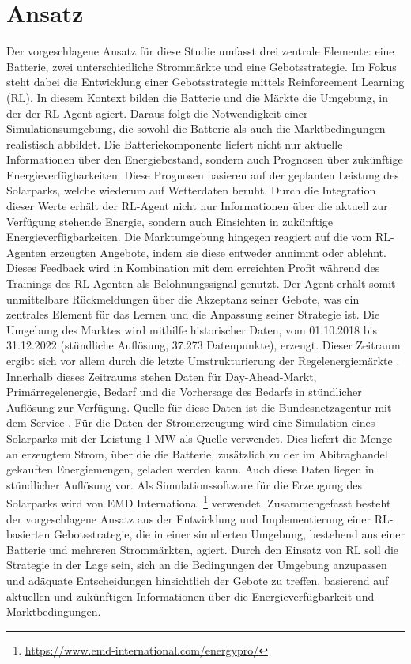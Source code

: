 \documentclass[a4paper, 11pt]{article}
\begin{document}
\section{Ansatz}
\label{approach}
Der vorgeschlagene Ansatz für diese Studie umfasst drei zentrale Elemente: eine Batterie, zwei unterschiedliche Strommärkte und eine Gebotsstrategie. Im Fokus steht dabei die Entwicklung einer Gebotsstrategie mittels Reinforcement Learning (RL). In diesem Kontext bilden die Batterie und die Märkte die Umgebung, in der der RL-Agent agiert. Daraus folgt die Notwendigkeit einer Simulationsumgebung, die sowohl die Batterie als auch die Marktbedingungen realistisch abbildet.
Die Batteriekomponente liefert nicht nur aktuelle Informationen über den Energiebestand, sondern auch Prognosen über zukünftige Energieverfügbarkeiten. Diese Prognosen basieren auf der geplanten Leistung des Solarparks, welche wiederum auf Wetterdaten beruht. Durch die Integration dieser Werte erhält der RL-Agent nicht nur Informationen über die aktuell zur Verfügung stehende Energie, sondern auch Einsichten in zukünftige Energieverfügbarkeiten.
Die Marktumgebung hingegen reagiert auf die vom RL-Agenten erzeugten Angebote, indem sie diese entweder annimmt oder ablehnt. Dieses Feedback wird in Kombination mit dem erreichten Profit während des Trainings des RL-Agenten als Belohnungssignal genutzt. Der Agent erhält somit unmittelbare Rückmeldungen über die Akzeptanz seiner Gebote, was ein zentrales Element für das Lernen und die Anpassung seiner Strategie ist.
Die Umgebung des Marktes wird mithilfe historischer Daten, vom 01.10.2018 bis 31.12.2022 (stündliche Auflösung, 37.273 Datenpunkte), erzeugt. Dieser Zeitraum ergibt sich vor allem durch die letzte Umstrukturierung der Regelenergiemärkte \cite{noauthor_bundesnetzagentur_nodate}. 
Innerhalb dieses Zeitraums stehen Daten für Day-Ahead-Markt, Primärregelenergie, Bedarf und die Vorhersage des Bedarfs in stündlicher Auflösung zur Verfügung. Quelle für diese Daten ist die Bundesnetzagentur mit dem Service  \cite{noauthor_smard_nodate}. Für die Daten der Stromerzeugung wird eine Simulation eines Solarparks mit der Leistung 1 MW als Quelle verwendet. Dies liefert die Menge an erzeugtem Strom, über die die Batterie, zusätzlich zu der im Abitraghandel gekauften Energiemengen, geladen werden kann. Auch diese Daten liegen in stündlicher Auflösung vor. Als Simulationssoftware für die Erzeugung des Solarparks wird  von EMD International \footnote{\url{https://www.emd-international.com/energypro/}} verwendet.
Zusammengefasst besteht der vorgeschlagene Ansatz aus der Entwicklung und Implementierung einer RL-basierten Gebotsstrategie, die in einer simulierten Umgebung, bestehend aus einer Batterie und mehreren Strommärkten, agiert. Durch den Einsatz von RL soll die Strategie in der Lage sein, sich an die Bedingungen der Umgebung anzupassen und adäquate Entscheidungen hinsichtlich der Gebote zu treffen, basierend auf aktuellen und zukünftigen Informationen über die Energieverfügbarkeit und Marktbedingungen.
\newpage
\end{document}
